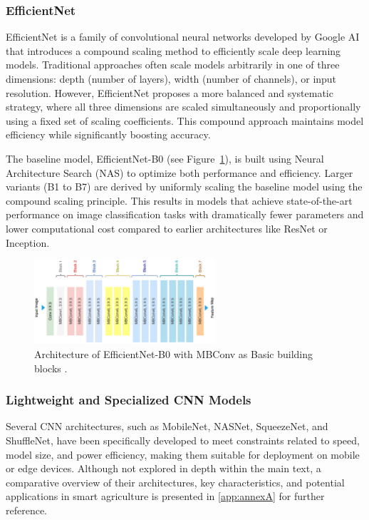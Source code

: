 \subsubsection{EfficientNet}


EfficientNet is a family of convolutional neural networks developed by Google AI that introduces a compound scaling method to efficiently scale deep learning models. Traditional approaches often scale models arbitrarily in one of three dimensions: depth (number of layers), width (number of channels), or input resolution. However, EfficientNet proposes a more balanced and systematic strategy, where all three dimensions are scaled simultaneously and proportionally using a fixed set of scaling coefficients. This compound approach maintains model efficiency while significantly boosting accuracy.

The baseline model, EfficientNet-B0 (see Figure~\ref{fig:figure13}), is built using Neural Architecture Search (NAS) to optimize both performance and efficiency. Larger variants (B1 to B7) are derived by uniformly scaling the baseline model using the compound scaling principle. This results in models that achieve state-of-the-art performance on image classification tasks with dramatically fewer parameters and lower computational cost compared to earlier architectures like ResNet or Inception.

\begin{figure}[H] %
    \centering
    \includegraphics[width=0.6\textwidth]{chapters/chapter1/images/Figure13.png}
    \caption{Architecture of EfficientNet-B0 with MBConv as Basic building blocks \parencite{ahmed2022classification}.}
    \label{fig:figure13}
\end{figure}

\subsubsection{Lightweight and Specialized CNN Models}
Several CNN architectures, such as MobileNet, NASNet, SqueezeNet, and ShuffleNet, have been specifically developed to meet constraints related to speed, model size, and power efficiency, making them suitable for deployment on mobile or edge devices. Although not explored in depth within the main text, a comparative overview of their architectures, key characteristics, and potential applications in smart agriculture is presented in \ref{app:annexA} for further reference.


